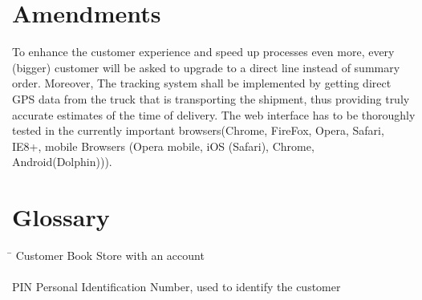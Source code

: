 \documentclass[11pt,a4paper,oneside,svgnames]{report}
\begin{document}
\chapter{Amendments}
To enhance the customer experience and speed up processes even more, every (bigger) customer will be asked to upgrade to a direct line instead of summary order. Moreover, The tracking system shall be implemented by getting direct GPS data from the truck that is transporting the shipment, thus providing truly accurate estimates of the time of delivery. The web interface has to be thoroughly tested in the currently important browsers(Chrome, FireFox, Opera, Safari, IE8+, mobile Browsers (Opera mobile, iOS (Safari), Chrome, Android(Dolphin))).
\chapter{Glossary}
\begin{tabbing}
\hspace{3cm}\=\kill
	Customer  \> Book Store with an account\\
	\\
	PIN       \> Personal Identification Number, used to identify the customer\\
	\\
	 
\end{tabbing} 

\listoffigures{}
\listoftables{}
\end{document}

